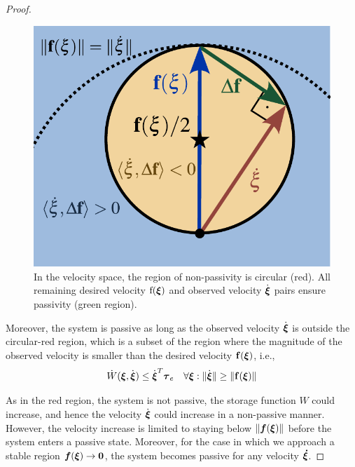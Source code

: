\begin{proof}
\begin{figure}[b]
	\centering
    \includegraphics[width=0.7\columnwidth]{figures/passivity_analysis}
	\caption{In the velocity space, the region of non-passivity is circular (red). All remaining desired velocity $\mathrm f(\mathrm{{\boldsymbol{\xi}}})$ and observed velocity $\dot{\mathrm {\boldsymbol{\xi}}}$ pairs ensure passivity (green region).}
	\label{fig:passivity_analysis}
\end{figure}

Moreover, the system is passive as long as the observed velocity $\dot{{\boldsymbol{\xi}}}$ is outside the circular-red region, which is a subset of the region where the magnitude of the observed velocity is smaller than the desired velocity $\mathbf{f}({\boldsymbol{\xi}})$, i.e.,
\begin{equation}
	\dot W({\boldsymbol{\xi}}, \dot{{\boldsymbol{\xi}}}) \leq \dot{{\boldsymbol{\xi}}}^T \boldsymbol{\tau}_e
 \quad \forall {\boldsymbol{\xi}} : \| \dot{{\boldsymbol{\xi}}} \| \geq\| \mathbf{f}({\boldsymbol{\xi}}) \| 
\end{equation}

As in the red region, the system is not passive, the storage function $W$ could increase, and hence the velocity $\dot {\boldsymbol{\xi}}$ could increase in a non-passive manner. However, the velocity increase is limited to staying below $\| \boldsymbol{f}({\boldsymbol{\xi}}) \|$ before the system enters a passive state. Moreover, for the case in which we approach a stable region $\boldsymbol{f}({\boldsymbol{\xi}}) \rightarrow \boldsymbol{0}$, the system becomes passive for any velocity $\boldsymbol{\boldsymbol{\dot \xi}}$.


\end{proof}
